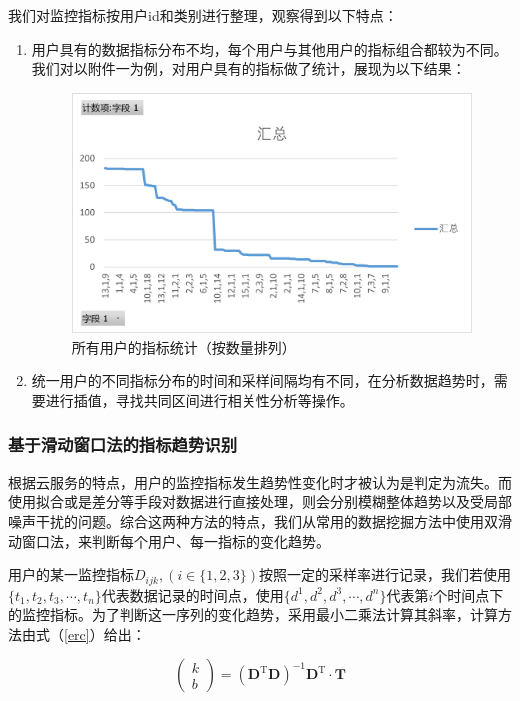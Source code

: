 \documentclass{my_paper}
\begin{document}
我们对监控指标按用户id和类别进行整理，观察得到以下特点：
\begin{enumerate}
    \item 用户具有的数据指标分布不均，每个用户与其他用户的指标组合都较为不同。我们对以附件一为例，对用户具有的指标做了统计，展现为以下结果：
    \begin {figure}[h]
    \centering %
    \includegraphics[width=\textwidth]{zhibiao.png}
    \caption{所有用户的指标统计（按数量排列）} %
    \label{five}
    \end {figure}
    \item 统一用户的不同指标分布的时间和采样间隔均有不同，在分析数据趋势时，需要进行插值，寻找共同区间进行相关性分析等操作。
\end{enumerate}

\subsubsection{基于滑动窗口法的指标趋势识别}

根据云服务的特点，用户的监控指标发生趋势性变化时才被认为是判定为流失。而使用拟合或是差分等手段对数据进行直接处理，则会分别模糊整体趋势以及受局部噪声干扰的问题。综合这两种方法的特点，我们从常用的数据挖掘方法中使用双滑动窗口法，来判断每个用户、每一指标的变化趋势。

用户的某一监控指标$D_{ijk},(i\in \{1,2,3\})$按照一定的采样率进行记录，我们若使用$\{t_1,t_2,t_3,\cdots,t_n\}$代表数据记录的时间点，使用$\{d^1,d^2,d^3,\cdots,d^n\}$代表第$i$个时间点下的监控指标。为了判断这一序列的变化趋势，采用最小二乘法计算其斜率，计算方法由式（\ref{erc}）给出：

\begin{equation}
    \left(\begin{array}{l}k \\b\end{array}\right)=\left(\boldsymbol{D}^{\mathrm{T}} \boldsymbol{D}\right)^{-1} \boldsymbol{D}^{\mathrm{T}} \cdot \boldsymbol{T}
\label{erc}
\end{equation}
\end{document}
